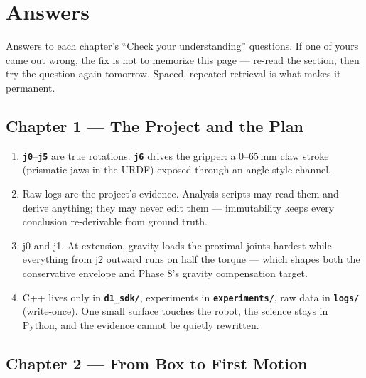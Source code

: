 \documentclass[11pt,twoside,openright]{book}
\newcommand{\code}[1]{\texttt{\bfseries #1}}
\begin{document}

\chapter{Answers}\label{app:answers}

Answers to each chapter's ``Check your understanding'' questions. If one
of yours came out wrong, the fix is not to memorize this page --- re-read
the section, then try the question again tomorrow. Spaced, repeated
retrieval is what makes it permanent.

\section{Chapter 1 --- The Project and the Plan}

\begin{enumerate}
  \item \code{j0}--\code{j5} are true rotations. \code{j6} drives the
    gripper: a 0--65\,mm claw stroke (prismatic jaws in the URDF)
    exposed through an angle-style channel.
  \item Raw logs are the project's evidence. Analysis scripts may read
    them and derive anything; they may never edit them --- immutability
    keeps every conclusion re-derivable from ground truth.
  \item j0 and j1. At extension, gravity loads the proximal joints
    hardest while everything from j2 outward runs on half the torque ---
    which shapes both the conservative envelope and Phase 8's gravity
    compensation target.
  \item C++ lives only in \code{d1\_sdk/}, experiments in
    \code{experiments/}, raw data in \code{logs/} (write-once). One
    small surface touches the robot, the science stays in Python, and
    the evidence cannot be quietly rewritten.
\end{enumerate}

\section{Chapter 2 --- From Box to First Motion}
\end{document}
